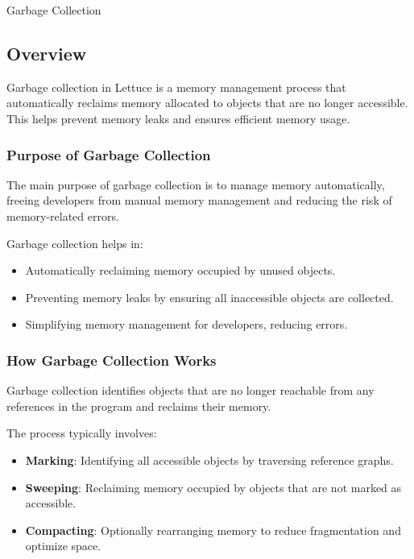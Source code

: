 \begin{notes}{Garbage Collection}
    \subsection*{Overview}

    Garbage collection in Lettuce is a memory management process that automatically reclaims memory allocated to objects that are no longer accessible. This helps prevent memory leaks and ensures efficient memory usage.
    
    \subsubsection*{Purpose of Garbage Collection}
    
    The main purpose of garbage collection is to manage memory automatically, freeing developers from manual memory management and reducing the risk of memory-related errors.
    
    \begin{highlight}
    
        Garbage collection helps in:
    
        \begin{itemize}
            \item Automatically reclaiming memory occupied by unused objects.
            \item Preventing memory leaks by ensuring all inaccessible objects are collected.
            \item Simplifying memory management for developers, reducing errors.
        \end{itemize}
    
    \end{highlight}
    
    \subsubsection*{How Garbage Collection Works}
    
    Garbage collection identifies objects that are no longer reachable from any references in the program and reclaims their memory.
    
    \begin{highlight}
    
        The process typically involves:
    
        \begin{itemize}
            \item \textbf{Marking}: Identifying all accessible objects by traversing reference graphs.
            \item \textbf{Sweeping}: Reclaiming memory occupied by objects that are not marked as accessible.
            \item \textbf{Compacting}: Optionally rearranging memory to reduce fragmentation and optimize space.
        \end{itemize}
    

\end{highlight}
\end{notes}
